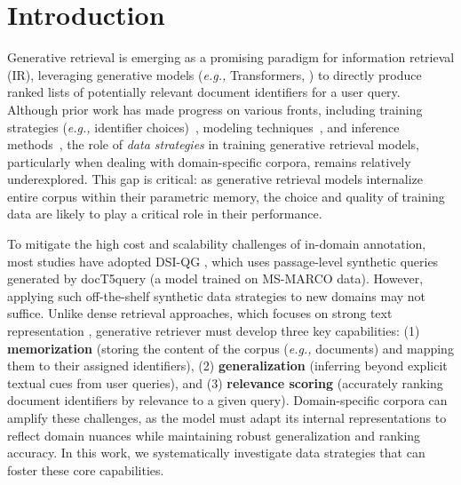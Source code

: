 \section{Introduction}

Generative retrieval is emerging as a promising paradigm for information retrieval (IR), leveraging generative models (\textit{e.g.,} Transformers, \citealp{DBLP:conf/nips/VaswaniSPUJGKP17}) to directly produce ranked lists of potentially relevant document identifiers for a user query.
Although prior work has made progress on various fronts, including training strategies (\textit{e.g.,} identifier choices)~\citep{DBLP:conf/nips/Tay00NBM000GSCM22,DBLP:journals/corr/abs-2208-09257,DBLP:conf/nips/BevilacquaOLY0P22,DBLP:conf/nips/0001YCWZRCYRR23}, modeling techniques~\citep{chen-etal-2023-understanding,zhou-etal-2023-enhancing-generative,DBLP:conf/aaai/00010WWL24}, and inference methods~\citep{DBLP:journals/corr/abs-2010-00904,lee-etal-2023-nonparametric,DBLP:conf/sigir/ZhangL0DLC24}, the role of \emph{data strategies} in training generative retrieval models, particularly when dealing with domain-specific corpora, remains relatively underexplored.
This gap is critical: as generative retrieval models internalize entire corpus within their parametric memory, the choice and quality of training data are likely to play a critical role in their performance.

To mitigate the high cost and scalability challenges of in-domain annotation, most studies have adopted DSI-QG \cite{DBLP:journals/corr/abs-2206-10128}, which uses passage-level synthetic queries generated by docT5query \cite{nogueiradoc2query} (a model trained on MS-MARCO data).
However, applying such off-the-shelf synthetic data strategies to new domains may not suffice.
Unlike dense retrieval approaches, which focuses on strong text representation \cite{karpukhin2020dense,izacard2021contriever}, 
generative retriever must develop three key capabilities: (1) \textbf{memorization} (storing the content of the corpus (\textit{e.g.,} documents) and mapping them to their assigned identifiers), (2) \textbf{generalization} (inferring beyond explicit textual cues from user queries), and (3) \textbf{relevance scoring} (accurately ranking document identifiers by relevance to a given query).
Domain-specific corpora can amplify these challenges, as the model must adapt its internal representations to reflect domain nuances while maintaining robust generalization and ranking accuracy.
In this work, we systematically investigate data strategies that can foster these core capabilities.

